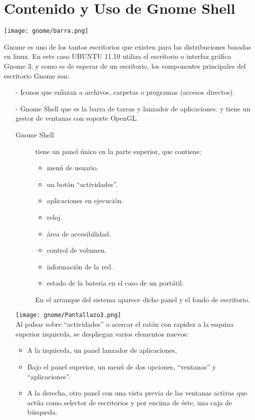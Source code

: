 \documentclass[12pt,letterpaper]{book}
\begin{document}
\chapter{Contenido y Uso de Gnome Shell}
\begin{center}
\texttt{[image: gnome/barra.png]}
\end{center}
Gnome es uno de los tantos escritorios que existen para las distribuciones basadas en linux.
En este caso UBUNTU 11.10 utiliza el escritorio o interfaz gráfica Gnome 3, y como es de esperar de un escritorio, los componentes principales del escritorio Gnome son:
\begin{itemize}
\item[-] Iconos que enlazan a archivos, carpetas o programas (accesos directos).
\item[-] Gnome Shell que es la barra de tareas y lanzador de aplicaciones. y tiene un gestor de ventanas con soporte OpenGL.
\begin{description}
\item[Gnome Shell] tiene un panel único en la parte superior, que contiene:
\begin{itemize}
 \item menú de usuario. 
 \item un botón “actividades”. 
 \item aplicaciones en ejecución.
 \item reloj.
 \item área de accesibilidad.
 \item control de volumen.
 \item información de la red.
 \item estado de la batería en el caso de un portátil.
\end{itemize}
En el arranque del sistema aparece dicho panel y el fondo de escritorio.
\end{description}
\texttt{[image: gnome/Pantallazo3.png]}\\ 
Al pulsar sobre “actividades” o acercar el ratón con rapidez a la esquina superior izquierda, se despliegan varios elementos nuevos:
\begin{itemize}
\item A la izquierda, un panel lanzador de aplicaciones,
\item Bajo el panel superior, un menú de dos opciones, “ventanas” y “aplicaciones”.
\item A la derecha, otro panel con una vista previa de las ventanas activas que actúa como selector de escritorios y por encima de éste, una caja de búsqueda.

\end{itemize}
\end{itemize}
\end{document}
